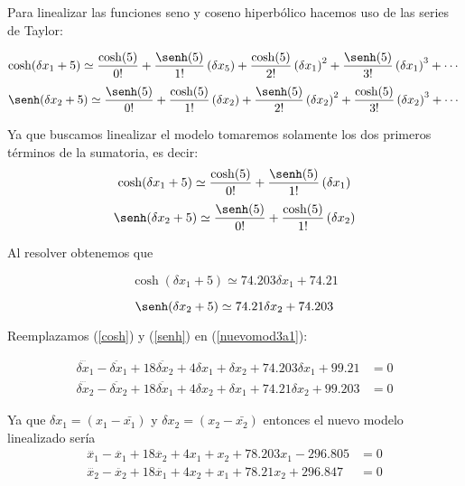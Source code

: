 \documentclass[letterpaper, 12pt]{article}
\begin{document}
\begin{enumerate}
\begin{enumerate}
Para linealizar las funciones seno y coseno hiperbólico hacemos uso de las series de Taylor: 

\begin{equation}
    \notag
    \cosh(\delta x_1 + 5)\simeq \frac{\cosh(5)}{0!}+\frac{\senh(5)}{1!}\left(\delta x_5\right)+\frac{\cosh(5)}{2!}\left(\delta x_1\right)^2+\frac{\senh(5)}{3!}\left(\delta x_1\right)^3+ \cdots
\end{equation}
\begin{equation}
    \notag
    \senh(\delta x_2 + 5)\simeq \frac{\senh(5)}{0!}+\frac{\cosh(5)}{1!}\left(\delta x_2\right)+\frac{\senh(5)}{2!}\left(\delta x_2\right)^2+\frac{\cosh(5)}{3!}\left(\delta x_2\right)^3+ \cdots
\end{equation}

Ya que buscamos linealizar el modelo tomaremos solamente los dos primeros términos de la sumatoria, es decir:
\begin{equation}
    \notag
    \cosh(\delta x_1 + 5)\simeq \frac{\cosh(5)}{0!}+\frac{\senh(5)}{1!}\left(\delta x_1\right)
\end{equation}
\begin{equation}
    \notag
    \senh(\delta x_2 + 5)\simeq \frac{\senh(5)}{0!}+\frac{\cosh(5)}{1!}\left(\delta x_2\right)
\end{equation}

Al resolver obtenemos que

\begin{equation}
    \cosh(\delta x_1 + 5)\simeq 74.203\delta x_1+74.21
    \label{cosh}
\end{equation}

\begin{equation}
    \senh(\delta x_2 + 5)\simeq 74.21\delta x_2+74.203
    \label{senh}
\end{equation}

Reemplazamos (\ref{cosh}) y (\ref{senh}) en (\ref{nuevomod3a1}):

\begin{equation}
\begin{split}
    \dddot{\delta x_1}-\ddot{\delta x_1}+18\ddot{\delta x_2}+4\delta x_1 +\delta x_2 +74.203\delta x_1+99.21 &= 0 \\ \dddot{\delta x_2}-\ddot{\delta x_2}+18\ddot{\delta x_1}+4\delta x_2 +\delta x_1 +74.21\delta x_2+99.203 &= 0 
\end{split}
\label{nuevomod3a1}
\end{equation}

Ya que $\delta x_1 = (x_1-\bar {x_1})$ y $\delta x_2 = (x_2-\bar{x_2})$ entonces el nuevo modelo linealizado sería 
\begin{equation}
\begin{split}
    \dddot{x_1}-\ddot{x_1}+18\ddot{x_2}+4x_1 + x_2 +78.203 x_1-296.805 &= 0 \\ \dddot{x_2}-\ddot{x_2}+18\ddot{x_1}+4x_2 +x_1 +78.21 x_2+296.847 &= 0 
\end{split}
\label{nuevomod3afinish}
\end{equation}


\end{enumerate}
\end{enumerate}
\end{document}
